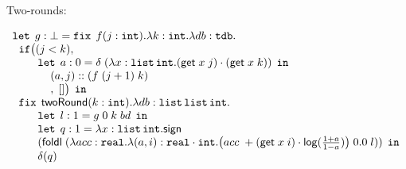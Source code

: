 \newpage
\begin{figure}
\small
Two-rounds:

\[
\begin{array}{l}
  \mathop{\mathtt{let}} \;  g: \bot = 
  \mathop{\mathtt{fix}} \; f(j: \mathtt{int}). \lambda k: \mathtt{int}. \lambda db: \mathtt{tdb}.\\
  \hspace{.2cm}  \mathtt{if} \big (  (j < k)  ,  \\
  \hspace{.8cm}  \mathop{\mathtt{let}} \;  a: 0 = 
                 \delta \;  
                 (\lambda x: \mathtt{list} \, \mathtt{int}. 
                 (\mathsf{get} \; x \; j) \cdot (\mathsf{get} \; x \; k) ) 
                  \; \mathop{ \mathtt{in}} \\
  \hspace{1.2cm} (a, j) :: (f  \; (j+1) \;  k) \\
  \hspace{1.2cm} ,\;  [] \big) \; \mathop{ \mathtt{in}}\\
  \hspace{.2cm}  \mathop{\mathtt{fix}} \; \mathsf{twoRound}(k : \mathtt{int}). 
                 \lambda db:\mathtt{list} \, \mathtt{list} \, \mathtt{int}.\\
  \hspace{.8cm}  \mathop{\mathtt{let}} \;  l: 1 = g \;  0 \;  k \; bd \;  \mathop{ \mathtt{in}} \\
  \hspace{.8cm}  \mathop{\mathtt{let}} \;  q: 1 =  \lambda x: \mathtt{list} \, \mathtt{int}. \mathsf{sign} \; \\ 
  \hspace{.8cm}  (\mathsf{foldl} \;  (\lambda acc: \mathtt{real}. 
                 \lambda (a,i): \mathtt{real} \cdot \mathtt{int}. 
                 \big(acc\; + (\mathsf{get} \; x \;  i) 
                 \cdot \mathsf{log}(\frac{1+a}{1-a}) \big)
                 \;  0.0 \;  l )) \;  \mathop{ \mathtt{in}} \\
  \hspace{.8cm}  \delta ( q )
\end{array}
\]
\end{figure}



